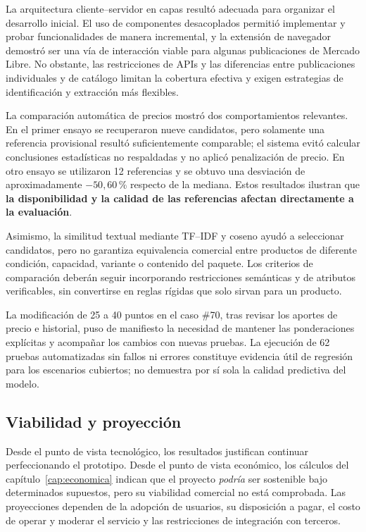 La arquitectura cliente--servidor en capas resultó adecuada para organizar el desarrollo inicial. El uso de componentes desacoplados permitió implementar y probar funcionalidades de manera incremental, y la extensión de navegador demostró ser una vía de interacción viable para algunas publicaciones de Mercado Libre. No obstante, las restricciones de APIs y las diferencias entre publicaciones individuales y de catálogo limitan la cobertura efectiva y exigen estrategias de identificación y extracción más flexibles.

La comparación automática de precios mostró dos comportamientos relevantes. En el primer ensayo se recuperaron nueve candidatos, pero solamente una referencia provisional resultó suficientemente comparable; el sistema evitó calcular conclusiones estadísticas no respaldadas y no aplicó penalización de precio. En otro ensayo se utilizaron 12 referencias y se obtuvo una desviación de aproximadamente $-50{,}60$\,\% respecto de la mediana. Estos resultados ilustran que \textbf{la disponibilidad y la calidad de las referencias afectan directamente a la evaluación}.

Asimismo, la similitud textual mediante TF--IDF y coseno ayudó a seleccionar candidatos, pero no garantiza equivalencia comercial entre productos de diferente condición, capacidad, variante o contenido del paquete. Los criterios de comparación deberán seguir incorporando restricciones semánticas y de atributos verificables, sin convertirse en reglas rígidas que solo sirvan para un producto.

La modificación de 25 a 40 puntos en el caso \#70, tras revisar los aportes de precio e historial, puso de manifiesto la necesidad de mantener las ponderaciones explícitas y acompañar los cambios con nuevas pruebas. La ejecución de 62 pruebas automatizadas sin fallos ni errores constituye evidencia útil de regresión para los escenarios cubiertos; no demuestra por sí sola la calidad predictiva del modelo.

\subsection{Viabilidad y proyección}\label{subsec:ml-conclusion-viabilidad}

Desde el punto de vista tecnológico, los resultados justifican continuar perfeccionando el prototipo. Desde el punto de vista económico, los cálculos del capítulo~\ref{cap:economica} indican que el proyecto \textit{podría} ser sostenible bajo determinados supuestos, pero su viabilidad comercial no está comprobada. Las proyecciones dependen de la adopción de usuarios, su disposición a pagar, el costo de operar y moderar el servicio y las restricciones de integración con terceros.

